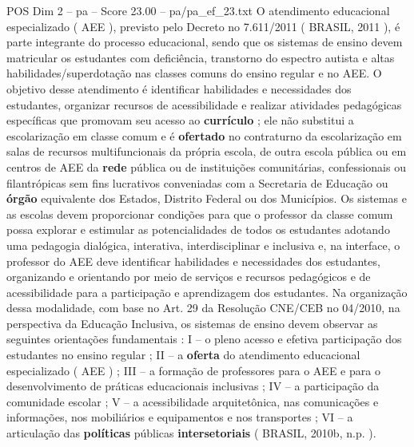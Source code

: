 \begin{textsample}{POS Dim 2 – pa – Score 23.00 – pa/pa\_ef\_23.txt}
O atendimento educacional especializado ( AEE ), previsto pelo Decreto no 7.611/2011 ( BRASIL, 2011 ), é parte integrante do processo educacional, sendo que os sistemas de ensino devem matricular os estudantes com deficiência, transtorno do espectro autista e altas habilidades/superdotação nas classes comuns do ensino regular e no AEE.
O objetivo desse atendimento é identificar habilidades e necessidades dos estudantes, organizar recursos de acessibilidade e realizar atividades pedagógicas específicas que promovam seu acesso ao \textbf{currículo} ; ele não substitui a escolarização em classe comum e é \textbf{ofertado} no contraturno da escolarização em salas de recursos multifuncionais da própria escola, de outra escola pública ou em centros de AEE da \textbf{rede} pública ou de instituições comunitárias, confessionais ou filantrópicas sem fins lucrativos conveniadas com a Secretaria de Educação ou \textbf{órgão} equivalente dos Estados, Distrito Federal ou dos Municípios.
Os sistemas e as escolas devem proporcionar condições para que o professor da classe comum possa explorar e estimular as potencialidades de todos os estudantes adotando uma pedagogia dialógica, interativa, interdisciplinar e inclusiva e, na interface, o professor do AEE deve identificar habilidades e necessidades dos estudantes, organizando e orientando por meio de serviços e recursos pedagógicos e de acessibilidade para a participação e aprendizagem dos estudantes.
Na organização dessa modalidade, com base no Art. 29 da Resolução CNE/CEB no 04/2010, na perspectiva da Educação Inclusiva, os sistemas de ensino devem observar as seguintes orientações fundamentais : I – o pleno acesso e efetiva participação dos estudantes no ensino regular ; II – a \textbf{oferta} do atendimento educacional especializado ( AEE ) ; III – a formação de professores para o AEE e para o desenvolvimento de práticas educacionais inclusivas ; IV – a participação da comunidade escolar ; V – a acessibilidade arquitetônica, nas comunicações e informações, nos mobiliários e equipamentos e nos transportes ; VI – a articulação das \textbf{políticas} públicas \textbf{intersetoriais} ( BRASIL, 2010b, n.p. ).

\end{textsample}

